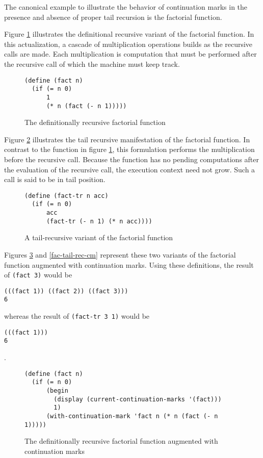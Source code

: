 \documentclass[ms]{byuprop}
\newcounter{definition}
\newcounter{example}
\begin{document}
The canonical example to illustrate the behavior of continuation marks in the presence and
absence of proper tail recursion is the factorial function.

Figure \ref{fac-rec} illustrates the definitional recursive variant of the factorial
function. In this actualization, a cascade of multiplication operations builds as the
recursive calls are made. Each multiplication is computation that must be performed after
the recursive call of which the machine must keep track.

\begin{figure}
\begin{verbatim}
(define (fact n)
  (if (= n 0)
      1
      (* n (fact (- n 1)))))
\end{verbatim}
\caption{The definitionally recursive factorial function}
\label{fac-rec}
\end{figure}

Figure \ref{fac-tail-rec} illustrates the tail recursive manifestation of the factorial
function. In contrast to the function in figure \ref{fac-rec}, this formulation performs
the multiplication before the recursive call. Because the function has no pending
computations after the evaluation of the recursive call, the execution context need not
grow. Such a call is said to be in tail position.

\begin{figure}
\begin{verbatim}
(define (fact-tr n acc)
  (if (= n 0)
      acc
      (fact-tr (- n 1) (* n acc))))
\end{verbatim}
\caption{A tail-recursive variant of the factorial function}
\label{fac-tail-rec}
\end{figure}

Figures \ref{fac-rec-cm} and \ref{fac-tail-rec-cm} represent these two variants of the
factorial function augmented with continuation marks. Using these definitions, the 
result of \texttt{(fact 3)} would be

\begin{verbatim}
(((fact 1)) ((fact 2)) ((fact 3)))
6
\end{verbatim}

whereas the result of \texttt{(fact-tr 3 1)} would be

\begin{verbatim}
(((fact 1)))
6
\end{verbatim}.

\begin{figure}
\begin{verbatim}
(define (fact n)
  (if (= n 0)
      (begin
        (display (current-continuation-marks '(fact)))
        1)
      (with-continuation-mark 'fact n (* n (fact (- n 1)))))
\end{verbatim}
\caption{The definitionally recursive factorial function augmented with continuation marks}
\label{fac-rec-cm}
\end{figure}
\end{document}

